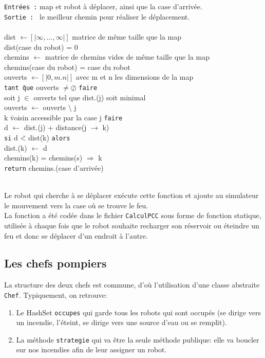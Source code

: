 \documentclass[a4paper,8pt]{article} %
\begin{document}
\begin{tabbing}
{\tt Entrées :} map et robot à déplacer, ainsi que la case d'arrivée.\\
{\tt Sortie : } le meilleur chemin pour réaliser le déplacement. \\ \\
dist $\leftarrow [|\infty,...,\infty|]$          matrice de même taille que la map \\
dist(case du robot) = 0\\
chemins $\leftarrow$          matrice de chemins vides de même taille que la map\\
chemins(case du robot) = case du robot \\
ouverts $\leftarrow [|0,m.n|]$          avec m et n les dimensions de la map\\
{\tt tant \= que} ouverts $\neq \oslash$ {\tt faire}\\
\> soit j $\in$ ouverts tel que dist.(j) soit minimal\\
\> ouverts $\leftarrow $ ouverts $\setminus$ {j}\\
 k \= voisin accessible par la case j {\tt faire} \\
\>\> d $\leftarrow$ dist.(j) + distance(j $\rightarrow$ k)\\
\> \> {\tt si} d \=< dist(k) {\tt alors} \\
\> \> \> dist.(k) $\leftarrow$ d\\
\> \> \> chemins(k) = chemins(s) $\Rightarrow$ k\\
{\tt return} chemins.(case d'arrivée)
\end{tabbing}
\\ 

Le robot qui cherche à se déplacer exécute cette fonction et ajoute au simulateur le mouvement vers la case où se trouve le feu. \\
La fonction a été codée dans le fichier {\tt CalculPCC} sous forme de fonction statique, utilisée à chaque fois que le robot souhaite
recharger son réservoir ou éteindre un feu et donc se déplacer d'un endroit à l'autre.

\subsection{Les chefs pompiers}
La structure des deux chefs est commune, d'où l'utilisation d'une classe abstraite \texttt{Chef}. Typiquement, on retrouve:
\begin{enumerate}
    \item Le HashSet \texttt{occupes} qui garde tous les robots qui sont occupés (se dirige vers un incendie, l'éteint,
    se dirige vers une source d'eau ou se remplit).
    \item La méthode \texttt{strategie} qui va être la seule méthode publique: elle va boucler sur nos incendies afin de leur assigner un robot.
\end{enumerate}
\end{document}

